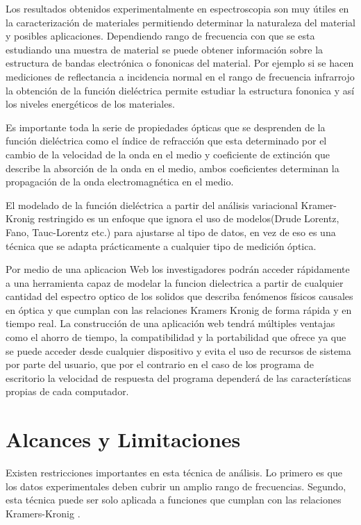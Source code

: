 \documentclass[a4paper,openright,12pt]{book}
\begin{document}
Los resultados obtenidos experimentalmente en espectroscopia son muy útiles en la caracterización de materiales permitiendo determinar la naturaleza del material y posibles aplicaciones. Dependiendo rango de frecuencia con que se esta estudiando una muestra de material se puede obtener información sobre la estructura de bandas electrónica o fononicas del material. Por ejemplo si se hacen mediciones de reflectancia a incidencia normal en el rango de frecuencia infrarrojo la obtención de la función dieléctrica permite estudiar la estructura fononica y así los niveles energéticos de los materiales\cite{SolidStatePhysics}. 

Es importante toda la serie de propiedades ópticas que se desprenden de la función dieléctrica como el índice de refracción que esta determinado por el cambio de la velocidad de la onda en el medio y coeficiente de extinción que describe la absorción de la onda en el medio, ambos coeficientes determinan la propagación de la onda electromagnética en el medio.  

El modelado de la función dieléctrica a partir del análisis variacional Kramer-Kronig restringido es un enfoque que ignora el uso de modelos(Drude Lorentz, Fano, Tauc-Lorentz etc.) para ajustarse al tipo de datos, en vez de eso es una técnica que se adapta prácticamente a cualquier tipo de medición óptica. 

Por medio de una aplicacion Web los investigadores podrán acceder rápidamente a una herramienta capaz de modelar  la funcion dielectrica a partir de cualquier cantidad  del espectro optico de los solidos que describa fenómenos físicos causales en óptica y que cumplan con las relaciones Kramers Kronig de forma rápida y en tiempo real. La construcción de una aplicación web tendrá múltiples ventajas como el ahorro de tiempo, la compatibilidad y la portabilidad que ofrece ya que se puede acceder desde cualquier dispositivo y evita el uso de recursos de sistema por parte del usuario, que por el contrario en el caso de los programa de escritorio la velocidad de respuesta del programa dependerá de las características propias de cada computador.\\


\section{Alcances y Limitaciones}

Existen restricciones importantes en esta técnica de análisis. Lo primero es que los datos experimentales deben cubrir un amplio rango de frecuencias. Segundo, esta técnica puede ser solo aplicada a funciones que cumplan con las relaciones Kramers-Kronig \cite{electrodynamics}. 
\end{document}
